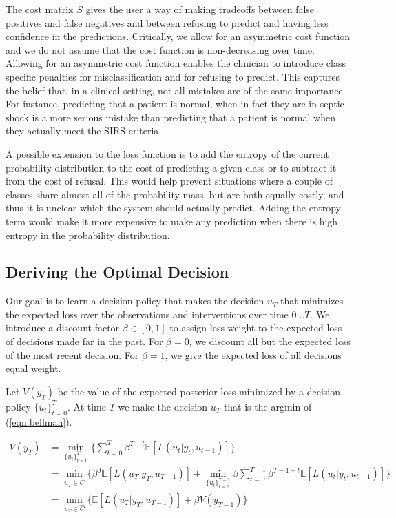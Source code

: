 \documentclass[12pt,solutions]{article}
\newcommand{\E}{\mathbb{E}}
\begin{document}
The cost matrix $S$ gives the user a way of making tradeoffs between false positives and false negatives and between refusing to predict and having less confidence in the predictions. Critically, we allow for an asymmetric cost function and we do not assume that the cost function is non-decreasing over time. Allowing for an asymmetric cost function enables the clinician to introduce class specific penalties for misclassification and for refusing to predict. This captures the belief that, in a clinical setting, not all mistakes are of the same importance. For instance, predicting that a patient is normal, when in fact they are in septic shock is a more serious mistake than predicting that a patient is normal when they actually meet the SIRS criteria. 

A possible extension to the loss function is to add the entropy of the current probability distribution to the cost of predicting a given class or to subtract it from the cost of refusal. This would help prevent situations where a couple of classes share almost all of the probability mass, but are both equally costly, and thus it is unclear which the system should actually predict. Adding the entropy term would make it more expensive to make any prediction when there is high entropy in the probability distribution.

\subsection{Deriving the Optimal Decision}

Our goal is to learn a decision policy that makes the decision $u_T$ that minimizes the expected loss over the observations and interventions over time $0\ldots T$. We introduce a discount factor $\beta \in [0,1]$ to assign less weight to the expected loss of decisions made far in the past. For $\beta = 0$, we discount all but the expected loss of the most recent decision. For $\beta = 1$, we give the expected loss of all decisions equal weight.


Let $V(y_T)$ be the value of the expected posterior loss minimized by a decision policy $\{u_t\}_{t=0}^{T}$. At time $T$ we make the decision $u_T$ that is the argmin of (\ref{eqn:bellman}).

\begin{align}
V(y_T) &= \min_{\{u_t\}_{t=0}^{T}} \Big\{ \sum_{t=0}^T \beta^{T-t}\E[L(u_t|y_t, u_{t-1})] \Big\}\\
&= \min_{u_T \in \hat{C}} \Big\{  \beta^{0}\E[L(u_T|y_T, u_{T-1})] + \min_{\{u_t\}_{t=0}^{T-1}} \beta \sum_{t=0}^{T-1} \beta^{T-1-t}\E[L(u_t|y_t, u_{t-1})] \Big\}\\
&= \min_{u_T \in \hat{C}} \Big\{  \E[L(u_T|y_T, u_{T-1})] + \beta V(y_{T-1})\Big\} \label{eqn:bellman}
\end{align}
\end{document}
